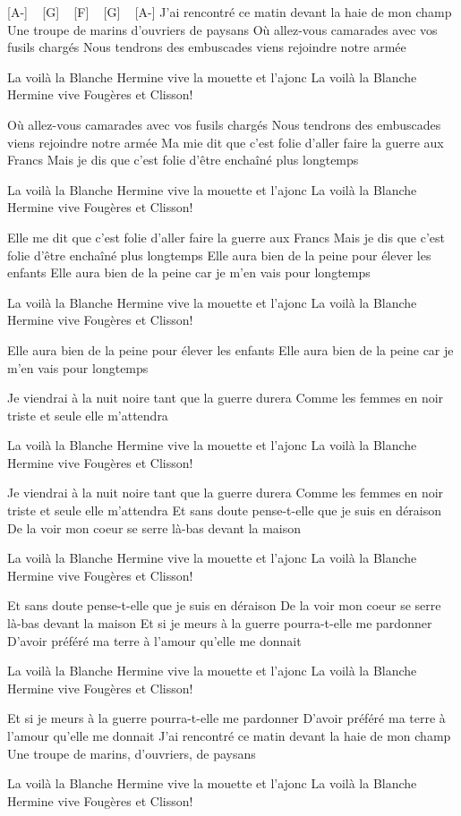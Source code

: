 
[A-] ~ [G] ~ [F] ~ [G] ~ [A-]
J'ai rencontré ce matin devant la haie de mon champ
Une troupe de marins d'ouvriers de paysans
Où allez-vous camarades avec vos fusils chargés
Nous tendrons des embuscades viens rejoindre notre armée


La voilà la Blanche Hermine vive la mouette et l'ajonc
La voilà la Blanche Hermine vive Fougères et Clisson!

Où allez-vous camarades avec vos fusils chargés
Nous tendrons des embuscades viens rejoindre notre armée
Ma mie dit que c'est folie d'aller faire la guerre aux Francs
Mais je dis que c'est folie d'être enchaîné plus longtemps

La voilà la Blanche Hermine vive la mouette et l'ajonc
La voilà la Blanche Hermine vive Fougères et Clisson!


Elle me dit que c'est folie d'aller faire la guerre aux Francs
Mais je dis que c'est folie d'être enchaîné plus longtemps
Elle aura bien de la peine pour élever les enfants
Elle aura bien de la peine car je m'en vais pour longtemps

La voilà la Blanche Hermine vive la mouette et l'ajonc
La voilà la Blanche Hermine vive Fougères et Clisson!

Elle aura bien de la peine pour élever les enfants
Elle aura bien de la peine car je m'en vais pour longtemps

Je viendrai à la nuit noire tant que la guerre durera
Comme les femmes en noir triste et seule elle m'attendra

La voilà la Blanche Hermine vive la mouette et l'ajonc
La voilà la Blanche Hermine vive Fougères et Clisson!

Je viendrai à la nuit noire tant que la guerre durera
Comme les femmes en noir triste et seule elle m'attendra
Et sans doute pense-t-elle que je suis en déraison
De la voir mon coeur se serre là-bas devant la maison


La voilà la Blanche Hermine vive la mouette et l'ajonc
La voilà la Blanche Hermine vive Fougères et Clisson!

Et sans doute pense-t-elle que je suis en déraison
De la voir mon coeur se serre là-bas devant la maison
Et si je meurs à la guerre pourra-t-elle me pardonner
D'avoir préféré ma terre à l'amour qu'elle me donnait

La voilà la Blanche Hermine vive la mouette et l'ajonc
La voilà la Blanche Hermine vive Fougères et Clisson!


Et si je meurs à la guerre pourra-t-elle me pardonner
D'avoir préféré ma terre à l'amour qu'elle me donnait
J'ai rencontré ce matin devant la haie de mon champ
Une troupe de marins, d'ouvriers, de paysans

La voilà la Blanche Hermine vive la mouette et l'ajonc
La voilà la Blanche Hermine vive Fougères et Clisson! 